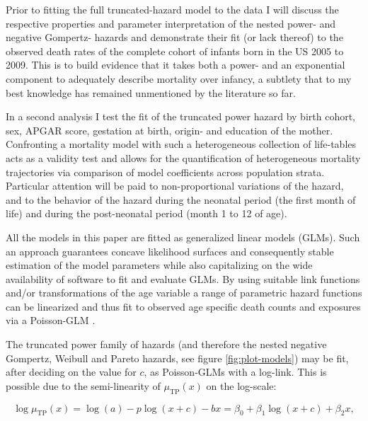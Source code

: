 \documentclass[smallextended]{svjour3} %
\begin{document}
Prior to fitting the full truncated-hazard model to the data I will
discuss the respective properties and parameter interpretation of the
nested power- and negative Gompertz- hazards and demonstrate their fit
(or lack thereof) to the observed death rates of the complete cohort of
infants born in the US 2005 to 2009. This is to build evidence that it
takes both a power- and an exponential component to adequately describe
mortality over infancy, a subtlety that to my best knowledge has
remained unmentioned by the literature so far.

In a second analysis I test the fit of the truncated power hazard by
birth cohort, sex, APGAR score, gestation at birth, origin- and
education of the mother. Confronting a mortality model with such a
heterogeneous collection of life-tables acts as a validity test and
allows for the quantification of heterogeneous mortality trajectories
via comparison of model coefficients across population strata.
Particular attention will be paid to non-proportional variations of the
hazard, and to the behavior of the hazard during the neonatal period
(the first month of life) and during the post-neonatal period (month 1
to 12 of age).

All the models in this paper are fitted as generalized linear models
(GLMs). Such an approach guarantees concave likelihood surfaces and
consequently stable estimation of the model parameters while also
capitalizing on the wide availability of software to fit and evaluate
GLMs. By using suitable link functions and/or transformations of the age
variable a range of parametric hazard functions can be linearized and
thus fit to observed age specific death counts and exposures via a
Poisson-GLM \citep{Aitkin1980, Clayton1983, Currie2016}.

The truncated power family of hazards (and therefore the nested negative
Gompertz, Weibull and Pareto hazards, see figure \ref{fig:plot-models})
may be fit, after deciding on the value for \(c\), as Poisson-GLMs with
a log-link. This is possible due to the semi-linearity of
\(\mu_\text{TP}(x)\) on the log-scale:

\[
\log \mu_\text{TP}(x) = \log(a)-p\log(x+c)-bx = \beta_0+\beta_1\log(x+c)+\beta_2x,
\]
\end{document}
